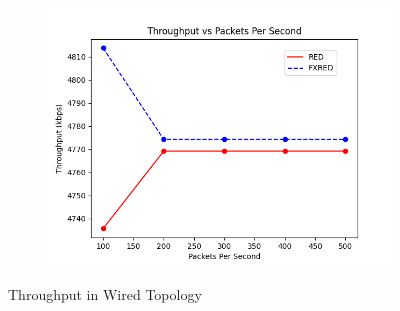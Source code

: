 \documentclass[10pt]{report}
\begin{document}
\begin{figure}
    \begin{subfigure}{.5\textwidth}
        \includegraphics[width=1\linewidth]{static/graphs/wired/Throughput vs Packets Per Second.png}
    \end{subfigure}
    \caption{Throughput in Wired Topology}
    \label{fig:wired_throughput}
\end{figure}
\end{document}
